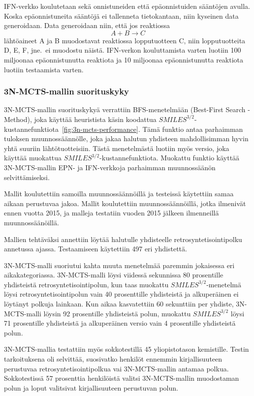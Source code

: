 \documentclass[finnish,twoside,censored,tkt,sw-line]{HYthesisML}
\begin{document}
IFN-verkko koulutetaan sekä onnistuneiden että epäonnistuiden sääntöjen avulla.
Koska epäonnistuneita sääntöjä ei tallenneta tietokantaan, niin kyseinen data generoidaan.
Data generoidaan niin, että jos reaktiossa \[A + B \rightarrow C\] lähtöaineet A ja B muodostavat reaktiossa lopputuotteen C, niin lopputuotteita D, E, F, jne.\ ei muodostu näistä.
IFN-verkon kouluttamista varten luotiin 100 miljoonaa epäonnistunutta reaktiota ja 10 miljoonaa epäonnistunutta reaktiota luotiin testaamista varten.

\subsubsection{3N-MCTS-mallin suorituskyky}

3N-MCTS-mallin suorituskykyä verrattiin BFS-menetelmään (Best-First Search -Method), joka käyttää heuristista käsin koodattua \(SMILES^{3/2}\)-kustannefunktiota~\ref{fig:3n-mcts-performance}.
Tämä funktio antaa parhaimman tuloksen muunnossäännölle, joka jakaa halutun yhdisteen mahdollisimman hyvin yhtä suuriin lähtötuotteisiin.
Tästä menetelmästä luotiin myös versio, joka käyttää muokattua \(SMILES^{3/2}\)-kustannefunktiota.
Muokattu funktio käyttää 3N-MCTS-mallin EPN- ja IFN-verkkoja parhaimman muunnossäänön selvittämiseksi.

Mallit koulutettiin samoilla muunnossäännöillä ja testeissä käytettiin samaa aikaan perustuvaa jakoa.
Mallit koulutettiin muunnossäännöillä, jotka ilmenivät ennen vuotta 2015, ja malleja testatiin vuoden 2015 jälkeen ilmenneillä muunnossäänöillä.

Mallien tehtäväksi annettiin löytää halutulle yhdisteelle retrosyntetisointipolku annetussa ajassa.
Testaamiseen käytettiin 497 eri yhdistettä.

3N-MCTS-malli suoriutui kahta muuta menetelmää paremmin jokaisessa eri aikakategoriassa.
3N-MCTS-malli löysi viidessä sekunnissa 80 prosentille yhdisteistä retrosyntetisointipolun, kun taas muokattu \(SMILES^{3/2}\)-menetelmä löysi retrosyntetisointipolun vain 40 prosenttille yhdisteistä ja alkuperäinen ei löytänyt polkuja lainkaan.
Kun aikaa kasvatettiin 60 sekunttiin per yhdiste, 3N-MCTS-malli löysin 92 prosentille yhdisteistä polun, muokattu \(SMILES^{3/2}\) löysi 71 prosentille yhdisteistä ja alkuperäinen versio vain 4 prosentille yhdisteistä polun.

3N-MCTS-mallia testattiin myös sokkotestillä 45 yliopistotason kemistille.
Testin tarkoituksena oli selvittää, suosivatko henkilöt ennemmin kirjallisuuteen perustuvaa retrosyntetisointipolkua vai 3N-MCTS-mallin antamaa polkua.
Sokkotestissä 57 prosenttia henkilöistä valitsi 3N-MCTS-mallin muodostaman polun ja loput valitsivat kirjallisuuteen perustuvan polun.
\end{document}
